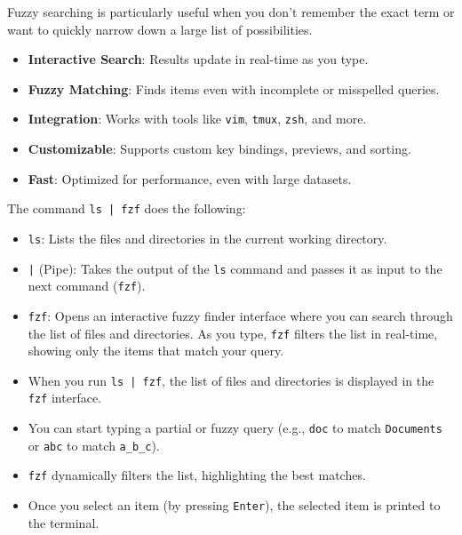 \documentclass{article}
\newcounter{subsubsubsection}[subsubsection]
\begin{document}
Fuzzy searching is particularly useful when you don't remember the exact term or want to quickly narrow down a large list of possibilities.


\begin{itemize}
    \item \textbf{Interactive Search}: Results update in real-time as you type.
    \item \textbf{Fuzzy Matching}: Finds items even with incomplete or misspelled queries.
    \item \textbf{Integration}: Works with tools like \texttt{vim}, \texttt{tmux}, \texttt{zsh}, and more.
    \item \textbf{Customizable}: Supports custom key bindings, previews, and sorting.
    \item \textbf{Fast}: Optimized for performance, even with large datasets.
\end{itemize}

The command \texttt{ls | fzf} does the following:

\begin{itemize}
    \item \texttt{ls}: Lists the files and directories in the current working directory.
    \item \texttt{|} (Pipe): Takes the output of the \texttt{ls} command and passes it as input to the next command (\texttt{fzf}).
    \item \texttt{fzf}: Opens an interactive fuzzy finder interface where you can search through the list of files and directories. As you type, \texttt{fzf} filters the list in real-time, showing only the items that match your query.
\end{itemize}

\begin{itemize}
    \item When you run \texttt{ls | fzf}, the list of files and directories is displayed in the \texttt{fzf} interface.
    \item You can start typing a partial or fuzzy query (e.g., \texttt{doc} to match \texttt{Documents} or \texttt{abc} to match \texttt{a\_b\_c}).
    \item \texttt{fzf} dynamically filters the list, highlighting the best matches.
    \item Once you select an item (by pressing \texttt{Enter}), the selected item is printed to the terminal.
\end{itemize}
\end{document}
